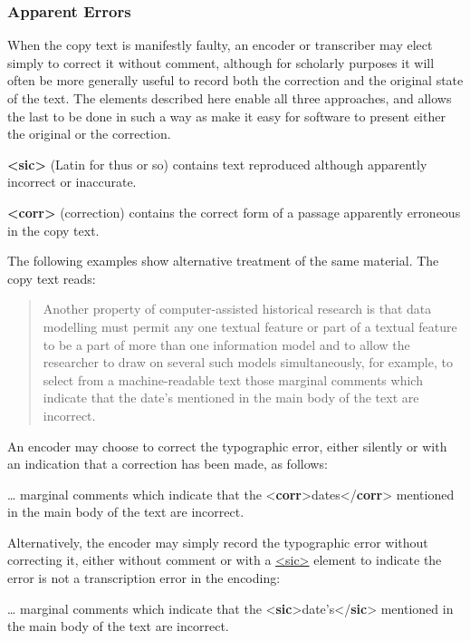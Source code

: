 \subsubsection[{Apparent Errors}]{Apparent Errors}\label{COEDCOR}\par
When the copy text is manifestly faulty, an encoder or transcriber may elect simply to correct it without comment, although for scholarly purposes it will often be more generally useful to record both the correction and the original state of the text. The elements described here enable all three approaches, and allows the last to be done in such a way as make it easy for software to present either the original or the correction. 
\begin{sansreflist}
  
\item [\textbf{<sic>}] (Latin for thus or so) contains text reproduced although apparently incorrect or inaccurate.
\item [\textbf{<corr>}] (correction) contains the correct form of a passage apparently erroneous in the copy text.
\end{sansreflist}
\par
The following examples show alternative treatment of the same material. The copy text reads: 
\begin{quote}Another property of computer-assisted historical research is that data modelling must permit any one textual feature or part of a textual feature to be a part of more than one information model and to allow the researcher to draw on several such models simultaneously, for example, to select from a machine-readable text those marginal comments which indicate that the date's mentioned in the main body of the text are incorrect.\end{quote}
\par
An encoder may choose to correct the typographic error, either silently or with an indication that a correction has been made, as follows: \par\bgroup{}\exampleFont \begin{shaded}\noindent\mbox{}… marginal comments which indicate that the {<\textbf{corr}>}dates{</\textbf{corr}>}\mbox{}\newline 
 mentioned in the main body of the text are incorrect.\end{shaded}\egroup\par \par
Alternatively, the encoder may simply record the typographic error without correcting it, either without comment or with a \hyperref[TEI.sic]{<sic>} element to indicate the error is not a transcription error in the encoding: \par\bgroup{}\exampleFont \begin{shaded}\noindent\mbox{}… marginal comments which indicate that the {<\textbf{sic}>}date's{</\textbf{sic}>}\mbox{}\newline 
 mentioned in the main body of the text are incorrect.\end{shaded}\egroup\par \par

